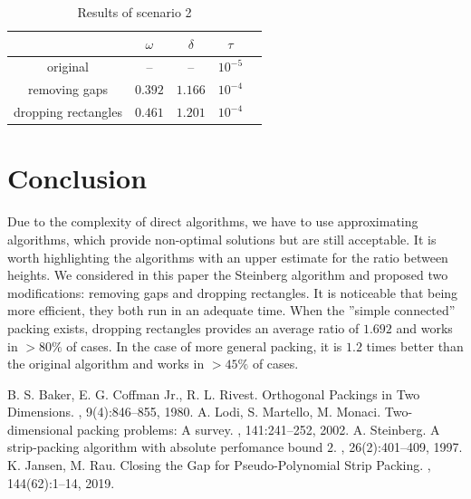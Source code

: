 \documentclass{article}
\theoremstyle{definition}
\theoremstyle{theorem}
\numberwithin{proposition}{section}
\begin{document}
    \begin{table}[H]
        \begin{center}
            \begin{tabular}{|c|c|c|c|c|} 
                 \hline
                  &  $\omega$ & $\delta$ & $\tau$ \\  
                 \hline
                 original  & -- & -- & $10^{-5}$ \\ 
                 \hline
                 removing gaps & $0.392$ & $1.166$ & $10^{-4}$ \\
                 \hline
                 dropping rectangles  & $0.461$ & $1.201$ & $10^{-4}$ \\
                 \hline
            \end{tabular}
            \caption{Results of scenario 2}
        \end{center}
    \end{table}
\section*{Conclusion}
    Due to the complexity of direct algorithms, we have to use approximating algorithms, which provide non-optimal solutions but are still acceptable. It is worth highlighting the algorithms with an upper estimate for the ratio between heights. We considered in this paper the Steinberg algorithm and proposed two modifications: removing gaps and dropping rectangles. It is noticeable that being more efficient, they both run in an adequate time. When the ''simple connected'' packing exists, dropping rectangles provides an average ratio of $1.692$ and works in $> 80\%$ of cases. In the case of more general packing, it is $1.2$ times better than the original algorithm and works in $> 45\%$ of cases.

\begin{thebibliography}{1}
        B. S. Baker, E. G. Coffman Jr., R. L. Rivest.
        \newblock Orthogonal Packings in Two Dimensions.
        , 9(4):846--855, 1980.
        A. Lodi, S. Martello, M. Monaci.
        \newblock Two-dimensional packing problems: A survey.
        , 141:241--252, 2002.
        A. Steinberg.
        \newblock A strip-packing algorithm with absolute perfomance bound $2$.
        , 26(2):401--409, 1997.
        K. Jansen, M. Rau.
        \newblock Closing the Gap for Pseudo-Polynomial Strip Packing.
        , 144(62):1--14, 2019.
\end{thebibliography}
\end{document}
